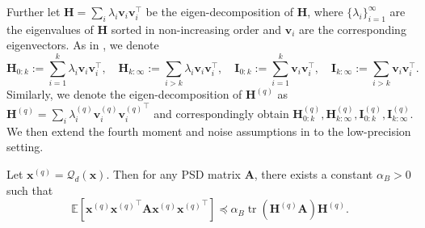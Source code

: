 \documentclass[11pt, letterpaper]{article}
\begin{document}
Further let $\mathbf{H}= \sum_i \lambda_i\mathbf{v}_i\mathbf{v}_i^\top$ be the eigen-decomposition of $\mathbf H$, where $\{\lambda_i\}_{i=1}^\infty$ are the eigenvalues of $\mathbf{H}$ sorted in non-increasing order and $\mathbf{v}_i$ are the corresponding eigenvectors. As in \citet{zou2023benign}, we denote
\begin{equation*}    \mathbf{H}_{0:k}:=\sum_{i=1}^k\lambda_i\mathbf{v}_i\mathbf{v}_i^\top,\quad\mathbf{H}_{k:\infty}:=\sum_{i>k}\lambda_i\mathbf{v}_i\mathbf{v}_i^\top,\quad \mathbf{I}_{0:k}:=\sum_{i=1}^k\mathbf{v}_i\mathbf{v}_i^\top,\quad\mathbf{I}_{k:\infty}:=\sum_{i>k}\mathbf{v}_i\mathbf{v}_i^\top.
\end{equation*}
Similarly, we denote the eigen-decomposition of $\mathbf{H}^{(q)}$ as $\mathbf{H}^{(q)}= \sum_i \lambda_i^{(q)}\mathbf{v}_i^{(q)}{\mathbf{v}_i^{(q)}}^\top$ and correspondingly obtain $\mathbf{H}_{0:k}^{(q)},\mathbf{H}_{k:\infty}^{(q)},\mathbf{I}_{0:k}^{(q)},\mathbf{I}_{k:\infty}^{(q)}$. We then extend the fourth moment and noise assumptions in \citet{zou2023benign,lin2024scaling} to the low-precision setting.
\begin{assumption}
\label{ass2}
    Let $\mathbf{x}^{(q)}=\mathcal{Q}_d(\mathbf{x})$. Then for any PSD matrix $\mathbf A$, there exists a constant $\alpha_B>0$ such that
    \begin{equation*}
        \mathbb{E}\left[{\mathbf{x}^{(q)}}{\mathbf{x}^{(q)}}^\top\mathbf{A}{\mathbf{x}^{(q)}}{\mathbf{x}^{(q)}}^\top\right]\preceq\alpha_B\operatorname{tr}(\mathbf{H}^{(q)}\mathbf{A})\mathbf{H}^{(q)}.
    \end{equation*}
\end{assumption}
\end{document}
